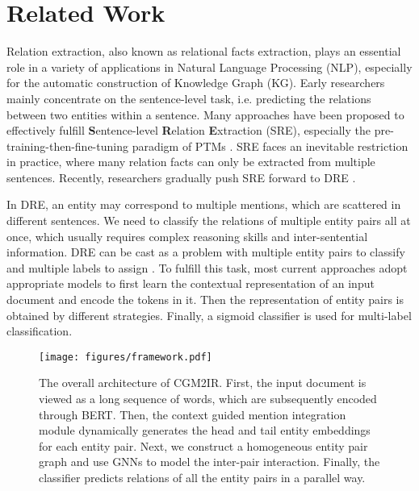 \documentclass[11pt]{article}
\begin{document}
\section{Related Work}

Relation extraction, also known as relational facts extraction, plays an essential role in a variety of applications in Natural Language Processing (NLP), especially for the automatic construction of Knowledge Graph (KG).
Early researchers mainly concentrate on the sentence-level task, i.e. predicting the relations between two entities within a sentence.
Many approaches \cite{zeng-etal-2014-relation,cai-etal-2016-bidirectional} have been proposed to effectively fulfill \textbf{S}entence-level \textbf{R}elation \textbf{E}xtraction (SRE), especially the pre-training-then-fine-tuning paradigm of PTMs \cite{zheng-etal-2021-prgc}.
SRE faces an inevitable restriction in practice, where many relation facts can only be extracted from multiple sentences.
Recently, researchers gradually push SRE forward to DRE \cite{yao-etal-2019-docred}.

In DRE, an entity may correspond to multiple mentions, which are scattered in different sentences.
We need to classify the relations of multiple entity pairs all at once, which usually requires complex reasoning skills and inter-sentential information.
DRE can be cast as a problem with multiple entity pairs to classify and multiple labels to assign \cite{DBLP:conf/aaai/Zhou0M021}.
To fulfill this task, most current approaches \cite{christopoulou-etal-2019-connecting} adopt appropriate models to first learn the contextual representation of an input document and encode the tokens in it. 
Then the representation of entity pairs is obtained by different strategies. 
Finally, a sigmoid classifier is used for multi-label classification.

\begin{figure*}[t]
	\begin{center}
		\texttt{[image: figures/framework.pdf]}
		\caption{The overall architecture of CGM2IR. First, the input document is viewed as a long sequence of words, which are subsequently encoded through BERT. Then, the context guided mention integration module dynamically generates the head and tail entity embeddings for each entity pair. Next, we construct a homogeneous entity pair graph and use GNNs to model the inter-pair interaction. Finally, the classifier predicts relations of all the entity pairs in a parallel way. }
		\label{fig:overview}
	\end{center}
\end{figure*}
\end{document}
